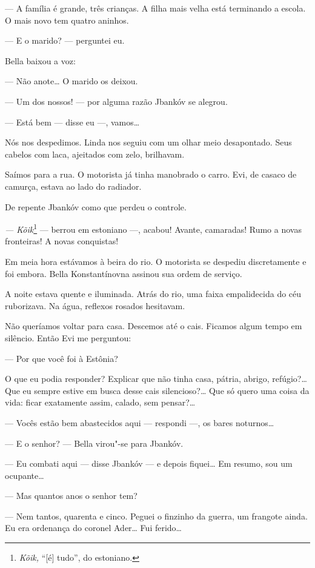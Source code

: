 --- A família é grande, três crianças. A filha mais velha está
terminando a escola. O mais novo tem quatro aninhos.

--- E o marido? --- perguntei eu.

Bella baixou a voz:

--- Não anote\ldots{} O marido os deixou.

--- Um dos nossos! --- por alguma razão Jbankóv se
alegrou.

--- Está bem --- disse eu ---, vamos\ldots{}

Nós nos despedimos. Linda nos seguiu com um olhar meio desapontado. Seus
cabelos com laca, ajeitados com zelo, brilhavam.

Saímos para a rua. O motorista já tinha manobrado o carro. Evi, de
casaco de camurça, estava ao lado do radiador.

De repente Jbankóv como que perdeu o controle.

\emph{--- Kõik}\footnote{\emph{Kõik,} ``{[}é{]} tudo'', do estoniano.}
--- berrou em estoniano ---, acabou! Avante, camaradas!
Rumo a novas fronteiras! A novas conquistas!

Em meia hora estávamos à beira do rio. O motorista se despediu
discretamente e foi embora. Bella Konstantínovna assinou sua ordem de
serviço.

A noite estava quente e iluminada. Atrás do rio, uma faixa empalidecida
do céu ruborizava. Na água, reflexos rosados hesitavam.

Não queríamos voltar para casa. Descemos até o cais. Ficamos algum tempo
em silêncio. Então Evi me perguntou:

--- Por que você foi à Estônia?

O que eu podia responder? Explicar que não tinha casa, pátria, abrigo,
refúgio?\ldots{} Que eu sempre estive em busca desse cais silencioso?\ldots{} Que
só quero uma coisa da vida: ficar exatamente assim, calado, sem
pensar?\ldots{}

--- Vocês estão bem abastecidos aqui --- respondi
---, os bares noturnos\ldots{}

--- E o senhor? --- Bella virou"-se para Jbankóv.

--- Eu combati aqui --- disse Jbankóv --- e depois
fiquei\ldots{} Em resumo, sou um ocupante\ldots{}

--- Mas quantos anos o senhor tem?

--- Nem tantos, quarenta e cinco. Peguei o finzinho da guerra, um
frangote ainda. Eu era ordenança do coronel Ader\ldots{} Fui ferido\ldots{}

